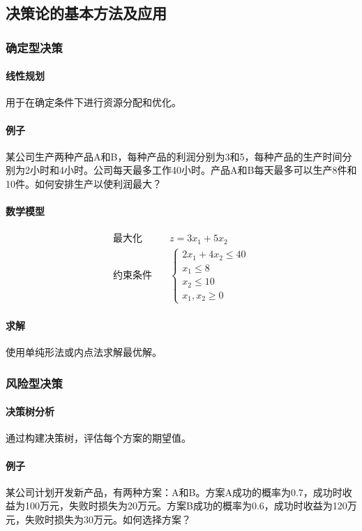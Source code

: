 \documentclass[UTF8]{ctexart}
\begin{document}
\subsection {决策论的基本方法及应用}
\subsubsection {确定型决策}
\paragraph{线性规划}
用于在确定条件下进行资源分配和优化。
\paragraph{例子}
某公司生产两种产品A和B，每种产品的利润分别为3和5，每种产品的生产时间分别为2小时和4小时。公司每天最多工作40小时。产品A和B每天最多可以生产8件和10件。如何安排生产以使利润最大？
\paragraph{数学模型}
\[
\begin{aligned}
\text{最大化} & \quad z = 3x_1 + 5x_2 \\
\text{约束条件} & \quad 
\begin{cases}
2x_1 + 4x_2 \leq 40 \\
x_1 \leq 8 \\
x_2 \leq 10 \\
x_1, x_2 \geq 0
\end{cases}
\end{aligned}
\]
\paragraph{求解}
使用单纯形法或内点法求解最优解。

\subsubsection {风险型决策}
\paragraph{决策树分析}
通过构建决策树，评估每个方案的期望值。
\paragraph{例子}
某公司计划开发新产品，有两种方案：A和B。方案A成功的概率为0.7，成功时收益为100万元，失败时损失为20万元。方案B成功的概率为0.6，成功时收益为120万元，失败时损失为30万元。如何选择方案？
\end{document}
